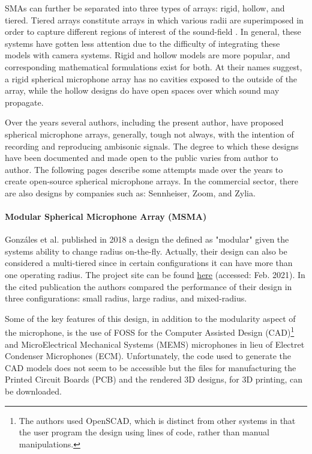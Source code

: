 SMAs can further be separated into three types of arrays: rigid, hollow, and tiered. Tiered arrays constitute arrays in which various radii are superimposed in order to capture different regions of interest of the sound-field \cite{dabin2015design}. In general, these systems have gotten less attention due to the difficulty of integrating these models with camera systems. Rigid and hollow models are more popular, and corresponding mathematical formulations exist for both. At their names suggest, a rigid spherical microphone array has no cavities exposed to the outside of the array, while the hollow designs do have open spaces over which sound may propagate.


Over the years several authors, including the present author, have proposed spherical microphone arrays, generally, tough not always, with the intention of recording and reproducing ambisonic signals. The degree to which these designs have been documented and made open to the public varies from author to author. The following pages describe some attempts made over the years to create open-source spherical microphone arrays. In the commercial sector, there are also designs by companies such as: Sennheiser, Zoom, and Zylia. 

\paragraph{Modular Spherical Microphone Array (MSMA)}

Gonzáles et al. \cite{gonzalez2018modular} published in 2018 a design the defined as "modular" given the systems ability to change radius on-the-fly. Actually, their design can also be considered a multi-tiered since in certain configurations it can have more than one operating radius. The project site can be found \href{https://www.appropedia.org/Modular_Spherical_Microphone_Array}{here} (accessed: Feb. 2021). In the cited publication the authors compared the performance of their design in three configurations: small radius, large radius, and mixed-radius. 

Some of the key features of this design, in addition to the modularity aspect of the microphone, is the use of FOSS for the Computer Assisted Design (CAD)\footnote{The authors used OpenSCAD, which is distinct from other systems in that the user program the design using lines of code, rather than manual manipulations.} and MicroElectrical Mechanical Systems (MEMS) microphones in lieu of Electret Condenser Microphones (ECM). Unfortunately, the code used to generate the CAD models does not seem to be accessible but the files for manufacturing the Printed Circuit Boards (PCB) and the rendered 3D designs, for 3D printing, can be downloaded. 


